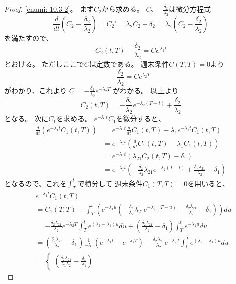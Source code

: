 \documentclass[uplatex]{jsarticle}
\theoremstyle{definition}
\begin{document}
\begin{proof}
  \ref{enumi: 10.3-2}。
  まず\(C_2\)から求める。
  \(C_2 - \frac{\delta_2}{\lambda_2}\)は微分方程式
  \[
  \frac{d}{dt}\left( C_2 - \frac{\delta_2}{\lambda_2}\right)
  = C_2' = \lambda_2C_2 - \delta_2
  = \lambda_2\left( C_2 - \frac{\delta_2}{\lambda_2} \right)
  \]
  を満たすので、
  \[
  C_2(t,T) - \frac{\delta_2}{\lambda_2}
  = Ce^{\lambda_2t}
  \]
  とおける。
  ただしここで\(C\)は定数である。
  週末条件\(C(T,T)=0\)より
  \[
  - \frac{\delta_2}{\lambda_2} = Ce^{\lambda_2T}
  \]
  がわかり、これより
  \(C=-\frac{\delta_2}{\lambda_2}e^{-\lambda_2T}\)
  がわかる。
  以上より
  \[
  C_2(t,T)
  = - \frac{\delta_2}{\lambda_2}e^{-\lambda_2(T-t)}
  + \frac{\delta_2}{\lambda_2}
  \]
  となる。
  次に\(C_1\)を求める。
  \(e^{-\lambda_1t}C_1\)を微分すると、
  \begin{align*}
    \frac{d}{dt}\left( e^{-\lambda_1t}C_1(t,T)\right)
    &= e^{-\lambda_1t}\frac{d}{dt}C_1(t,T)
    - \lambda_1e^{-\lambda_1t}C_1(t,T) \\
    &= e^{-\lambda_1t}
    \left( \frac{d}{dt}C_1(t,T) - \lambda_1C_1(t,T) \right) \\
    &= e^{-\lambda_1t}
    \left( \lambda_{21}C_2(t,T) - \delta_1 \right) \\
    &= e^{-\lambda_1t}
    \left( - \frac{\delta_2}{\lambda_2}\lambda_{21}e^{-\lambda_2(T-t)}
    + \frac{\delta_2\lambda_{21}}{\lambda_2} - \delta_1 \right)
  \end{align*}
  となるので、これを\(\int_T^t\)で積分して
  週末条件\(C_1(T,T)=0\)を用いると、
  \begin{align*}
    &e^{-\lambda_1t}C_1(t,T) \\
    &= C_1(T,T) + \int_T^t\left( e^{-\lambda_1u}
    \left( - \frac{\delta_2}{\lambda_2}\lambda_{21}e^{-\lambda_2(T-u)}
    + \frac{\delta_2\lambda_{21}}{\lambda_2} - \delta_1 \right)
    \right) du \\
    &=
    - \frac{\delta_2\lambda_{21}}{\lambda_2}e^{-\lambda_2T}
    \int_T^t e^{(\lambda_2-\lambda_1)u} du
    + \left( \frac{\delta_2\lambda_{21}}{\lambda_2} - \delta_1 \right)
    \int_T^t e^{-\lambda_1u} du \\
    &= \left( \frac{\delta_2\lambda_{21}}{\lambda_2} - \delta_1 \right)
    \frac{1}{-\lambda_1}\left( e^{-\lambda_1t}-e^{-\lambda_1T} \right)
    + \frac{\delta_2\lambda_{21}}{\lambda_2}e^{-\lambda_2T}
    \int_t^T e^{(\lambda_2-\lambda_1)u} du \\
    &=
    \begin{cases}
      \left( \frac{\delta_2\lambda_{21}}{\lambda_1\lambda_2}
      - \frac{\delta_1}{\lambda_1} \right)

\end{cases}
\end{align*}
\end{proof}
\end{document}
